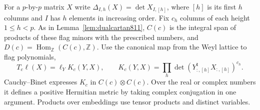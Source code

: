 \documentclass[a4paper,11pt]{article}
\theoremstyle{definition}
\theoremstyle{remark}
\newcommand{\ZZ}{\mathbb Z}\newcommand{\ord}{\operatorname{ord}}
\numberwithin{equation}{section}
\begin{document}
For a \(p\)-by-\(p\) matrix \(X\) write
\(\Delta_{I,h}(X)=\det X_{I,[h]}\), where \([h]\) is its
first \(h\) columns and \(I\) has \(h\) elements in increasing
order. Fix \(c_h\) columns of each height \(1\le h<p\).
As in Lemma~\ref{lem:dualcartan811}, \(C(c)\) is the integral
span of products of these flag minors with the prescribed
numbers, and \(D(c)=\operatorname{Hom}_{\ZZ}(C(c),\ZZ)\).
Use the canonical map from the Weyl lattice to flag polynomials,
\[
 T_c\ell(X)=\ell_Y K_c(Y,X),\qquad
 K_c(Y,X)=\prod_h
       \det\!\left(Y_{:,[h]}^{\mathsf t}X_{:,[h]}\right)^{c_h}.
\]
Cauchy--Binet expresses \(K_c\) in \(C(c)\otimes C(c)\).
Over the real or complex numbers it defines a positive
Hermitian metric by taking complex conjugation in one
argument. Products over embeddings use tensor products
and distinct variables.
\end{document}
